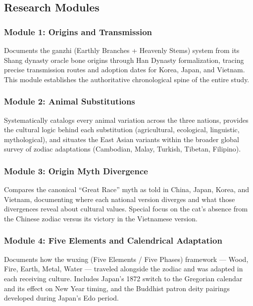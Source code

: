 \documentclass[11pt,letterpaper]{article}
\begin{document}
\subsection{Research Modules}

\subsubsection{Module 1: Origins and Transmission}

Documents the ganzhi (Earthly Branches + Heavenly Stems) system from its Shang dynasty oracle bone origins through Han Dynasty formalization, tracing precise transmission routes and adoption dates for Korea, Japan, and Vietnam. This module establishes the authoritative chronological spine of the entire study.

\subsubsection{Module 2: Animal Substitutions}

Systematically catalogs every animal variation across the three nations, provides the cultural logic behind each substitution (agricultural, ecological, linguistic, mythological), and situates the East Asian variants within the broader global survey of zodiac adaptations (Cambodian, Malay, Turkish, Tibetan, Filipino).

\subsubsection{Module 3: Origin Myth Divergence}

Compares the canonical ``Great Race'' myth as told in China, Japan, Korea, and Vietnam, documenting where each national version diverges and what those divergences reveal about cultural values. Special focus on the cat's absence from the Chinese zodiac versus its victory in the Vietnamese version.

\subsubsection{Module 4: Five Elements and Calendrical Adaptation}

Documents how the wuxing (Five Elements / Five Phases) framework --- Wood, Fire, Earth, Metal, Water --- traveled alongside the zodiac and was adapted in each receiving culture. Includes Japan's 1872 switch to the Gregorian calendar and its effect on New Year timing, and the Buddhist patron deity pairings developed during Japan's Edo period.
\end{document}

